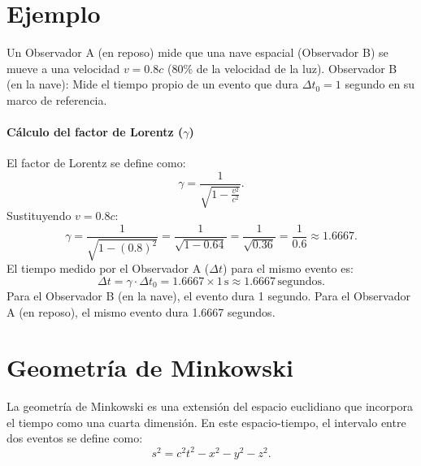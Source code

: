 \documentclass{article}
\begin{document}
\section{Ejemplo}

Un Observador A (en reposo) mide que una nave espacial (Observador B) se mueve a una velocidad $v = 0.8c$ (80\% de la velocidad de la luz).
Observador B (en la nave): Mide el tiempo propio de un evento que dura $\Delta t_0 = 1$ segundo en su marco de referencia.

\paragraph{Cálculo del factor de Lorentz ($\gamma$)}
El factor de Lorentz se define como:
\[
\gamma = \frac{1}{\sqrt{\displaystyle 1 - \frac{v^2}{c^2}}}.
\]
Sustituyendo $v = 0.8c$:
\[
\gamma = \frac{1}{\sqrt{1 - (0.8)^2}} = \frac{1}{\sqrt{1 - 0.64}} = \frac{1}{\sqrt{0.36}} = \frac{1}{0.6} \approx 1.6667.
\]
El tiempo medido por el Observador A ($\Delta t$) para el mismo evento es:
\[
\Delta t = \gamma \cdot \Delta t_0 = 1.6667 \times 1\, \text{s} \approx 1.6667\, \text{segundos}.
\]
Para el Observador B (en la nave), el evento dura 1 segundo. Para el Observador A (en reposo), el mismo evento dura 1.6667 segundos.


\section{Geometría de Minkowski}
La geometría de Minkowski es una extensión del espacio euclidiano que incorpora el tiempo como una cuarta dimensión. En este espacio-tiempo, el intervalo entre dos eventos se define como:
\[
s^2 = c^2 t^2 - x^2 - y^2 - z^2.
\]
\end{document}
